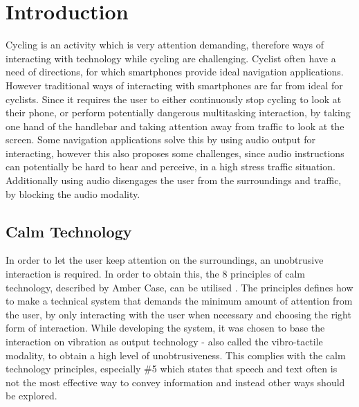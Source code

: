 \documentclass{sigchi}
\begin{document}
\section{Introduction}
Cycling is an activity which is very attention demanding, therefore ways of interacting with technology while cycling are challenging. Cyclist often have a need of directions, for which smartphones provide ideal navigation applications. However traditional ways of interacting with smartphones are far from ideal for cyclists. Since it requires the user to either continuously stop cycling to look at their phone, or perform potentially dangerous multitasking interaction, by taking one hand of the handlebar and taking attention away from traffic to look at the screen. 
\newline
\newline
Some navigation applications solve this by using audio output for interacting, however this also proposes some challenges, since audio instructions can potentially be hard to hear and perceive, in a high stress traffic situation. Additionally using audio disengages the user from the surroundings and traffic, by blocking the audio modality.
\subsection{Calm Technology}
In order to let the user keep attention on the surroundings, an unobtrusive interaction is required. In order to obtain this, the 8 principles of calm technology, described by Amber Case, can be utilised \cite{case15}. The principles  defines how to make a technical system that demands the minimum amount of attention from the user, by only interacting with the user when necessary and choosing the right form of  interaction.  
\newline
\newline 
While developing the system, it was chosen to base the interaction on vibration as output technology - also called the vibro-tactile modality, to obtain a high level of unobtrusiveness. This complies with the calm technology principles, especially  \#5 which states that speech and text often is not the most effective way to convey information and instead other ways should be explored.
\end{document}
